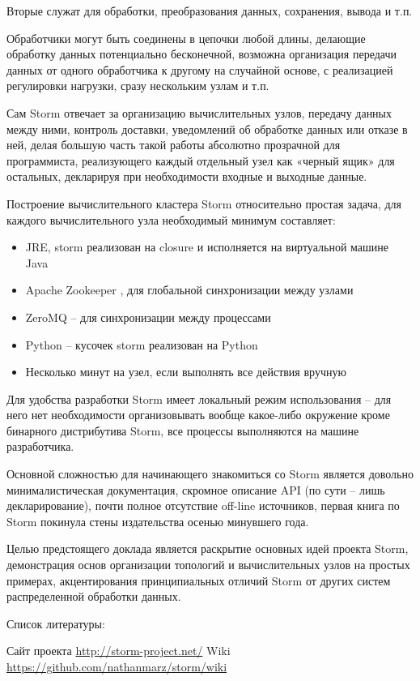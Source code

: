 \documentclass[10pt, a5paper]{article}
\begin{document}
Вторые служат для обработки, преобразования данных, сохранения, вывода и т.п.

Обработчики могут быть соединены в цепочки любой длины, делающие обработку данных потенциально бесконечной, возможна организация передачи данных от одного обработчика к другому на случайной основе, с реализацией регулировки нагрузки, сразу нескольким узлам и т.п.

Сам Storm отвечает за  организацию вычислительных узлов, передачу данных между ними, контроль доставки, уведомлений об обработке данных или отказе в ней, делая большую часть такой работы абсолютно прозрачной для программиста, реализующего каждый отдельный узел как «черный ящик» для остальных, декларируя при необходимости входные и выходные данные.

Построение вычислительного кластера Storm относительно простая задача, для каждого вычислительного узла необходимый минимум составляет: 
\begin{itemize}
\item JRE, storm реализован на closure и исполняется на виртуальной машине Java
\item Apache Zookeeper , для глобальной синхронизации между узлами
\item ZeroMQ  -- для синхронизации между процессами
\item Python – кусочек storm реализован на Python
\item Несколько минут на узел, если выполнять все действия вручную
\end{itemize}


Для удобства разработки Storm имеет локальный режим использования – для него нет необходимости организовывать вообще какое-либо окружение кроме бинарного дистрибутива Storm, все процессы выполняются на машине разработчика.

Основной сложностью для начинающего знакомиться со Storm является довольно минималистическая документация, скромное описание API (по сути – лишь декларирование), почти полное отсутствие off-line источников, первая книга по Storm покинула стены издательства осенью минувшего года.

Целью предстоящего доклада является раскрытие основных идей проекта Storm,  демонстрация основ организации топологий и вычислительных узлов на простых примерах, акцентирования принципиальных отличий Storm от других систем распределенной обработки данных.

Список литературы:

\begin{thebibliography}{9}
 Сайт проекта \url{http://storm-project.net/}
 Wiki \url{https://github.com/nathanmarz/storm/wiki}
\end{thebibliography}
\end{document}
